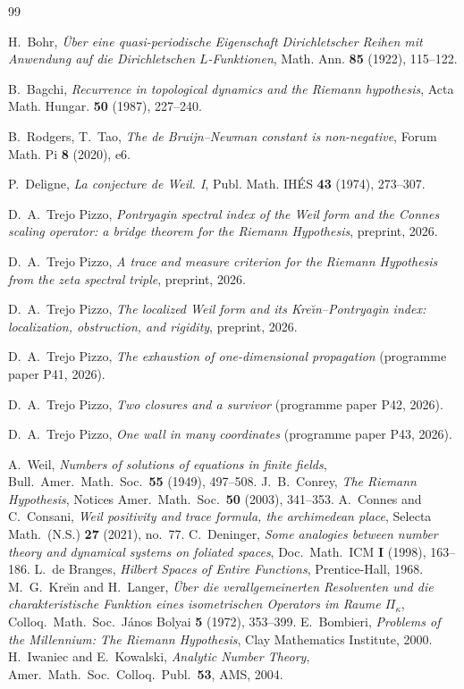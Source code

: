 \documentclass[11pt]{amsart}
\theoremstyle{definition}
\theoremstyle{remark}
\begin{document}
\begin{thebibliography}{99}

 H.~Bohr, \emph{\"Uber eine quasi-periodische Eigenschaft
Dirichletscher Reihen mit Anwendung auf die Dirichletschen $L$-Funktionen},
Math. Ann. \textbf{85} (1922), 115--122.

 B.~Bagchi, \emph{Recurrence in topological dynamics and
the Riemann hypothesis}, Acta Math. Hungar. \textbf{50} (1987), 227--240.

 B.~Rodgers, T.~Tao, \emph{The de Bruijn--Newman constant is
non-negative}, Forum Math. Pi \textbf{8} (2020), e6.

 P.~Deligne, \emph{La conjecture de Weil. I},
Publ. Math. IH\'ES \textbf{43} (1974), 273--307.

 D.~A.~Trejo Pizzo, \emph{Pontryagin spectral index of the Weil form and the Connes scaling operator: a bridge theorem for the Riemann Hypothesis}, preprint, 2026.

 D.~A.~Trejo Pizzo, \emph{A trace and measure criterion for the Riemann Hypothesis from the zeta spectral triple}, preprint, 2026.

 D.~A.~Trejo Pizzo, \emph{The localized Weil form and its Kre\u\i n--Pontryagin index: localization, obstruction, and rigidity}, preprint, 2026.

 D.~A.~Trejo Pizzo, \emph{The exhaustion of one-dimensional
propagation} (programme paper P41, 2026).

 D.~A.~Trejo Pizzo, \emph{Two closures and a survivor}
(programme paper P42, 2026).

 D.~A.~Trejo Pizzo, \emph{One wall in many coordinates}
(programme paper P43, 2026).

 A.~Weil, \emph{Numbers of solutions of equations in finite fields}, Bull.\ Amer.\ Math.\ Soc.\ \textbf{55} (1949), 497--508.
 J.~B.~Conrey, \emph{The Riemann Hypothesis}, Notices Amer.\ Math.\ Soc.\ \textbf{50} (2003), 341--353.
 A.~Connes and C.~Consani, \emph{Weil positivity and trace formula, the archimedean place}, Selecta Math.\ (N.S.) \textbf{27} (2021), no.~77.
 C.~Deninger, \emph{Some analogies between number theory and dynamical systems on foliated spaces}, Doc.\ Math.\ ICM \textbf{I} (1998), 163--186.
 L.~de Branges, \emph{Hilbert Spaces of Entire Functions}, Prentice-Hall, 1968.
 M.~G.~Kre\u\i n and H.~Langer, \emph{\"Uber die verallgemeinerten Resolventen und die charakteristische Funktion eines isometrischen Operators im Raume $\Pi_\kappa$}, Colloq.\ Math.\ Soc.\ J\'anos Bolyai \textbf{5} (1972), 353--399.
 E.~Bombieri, \emph{Problems of the Millennium: The Riemann Hypothesis}, Clay Mathematics Institute, 2000.
 H.~Iwaniec and E.~Kowalski, \emph{Analytic Number Theory}, Amer.\ Math.\ Soc.\ Colloq.\ Publ.\ \textbf{53}, AMS, 2004.
\end{thebibliography}
\end{document}
